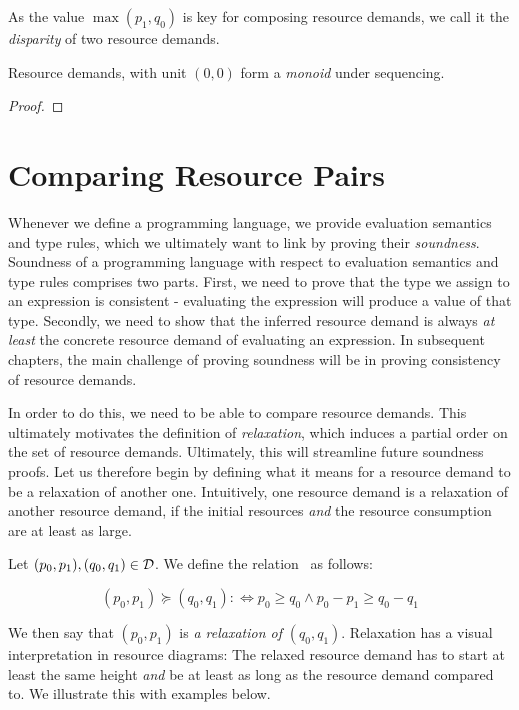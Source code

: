 As the value \(\max(p_1, q_0)\) is key for composing resource demands, we call it the \emph{disparity} of two resource demands.

\begin{lemma}
   Resource demands, with unit \((0, 0)\) form a \emph{monoid} under sequencing.
\end{lemma}

\begin{proof}
\end{proof}


\section{Comparing Resource Pairs}\label{sec:comp-pairs}

Whenever we define a programming language, we provide evaluation semantics and type rules, which we ultimately want to link by proving their \emph{soundness}. Soundness of a programming language with respect to evaluation semantics and type rules comprises two parts. First, we need to prove that the type we assign to an expression is consistent - evaluating the expression will produce a value of that type. Secondly, we need to show that the inferred resource demand is always \emph{at least} the concrete resource demand of evaluating an expression. In subsequent chapters, the main challenge of proving soundness will be in proving consistency of resource demands. 

In order to do this, we need to be able to compare resource demands. This ultimately motivates the definition of \emph{relaxation}, which induces a partial order on the set of resource demands. Ultimately, this will streamline future soundness proofs. Let us therefore begin by defining what it means for a resource demand to be a relaxation of another one. Intuitively, one resource demand is a relaxation of another resource demand, if the initial resources \emph{and} the resource consumption are at least as large.

\begin{definition}[Relaxation]\label{def:relaxation}
   Let \((p_0, p_1), (q_0, q_1) \in \mathcal{D}\). We define the relation \relaxation ~as follows:

   \[
      (p_0, p_1) \succcurlyeq (q_0, q_1) :\iff p_0 \geq q_0 \wedge p_0 - p_1 \geq q_0 - q_1
   \]
\end{definition}

We then say that \((p_0, p_1)\) is \emph{a relaxation of} \((q_0, q_1)\). Relaxation has a visual interpretation in resource diagrams: The relaxed resource demand has to start at least the same height \emph{and} be at least as long as the resource demand compared to. We illustrate this with examples below.

